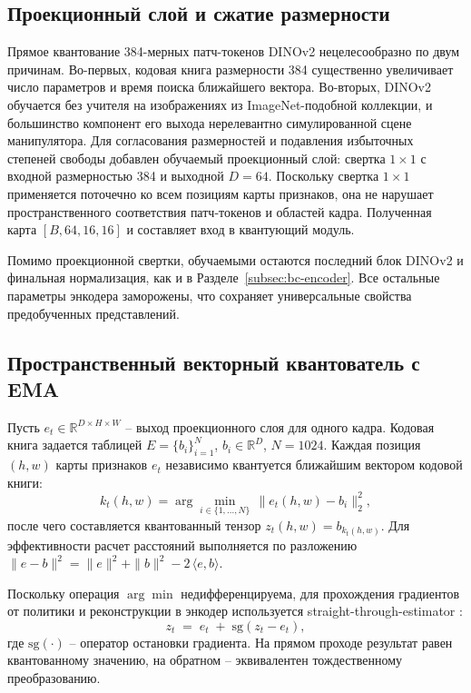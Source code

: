 \subsection{Проекционный слой и сжатие размерности}
\label{subsec:vq-proj}

Прямое квантование 384-мерных патч-токенов DINOv2 нецелесообразно по двум причинам. Во-первых, кодовая книга размерности 384 существенно увеличивает число параметров и время поиска ближайшего вектора. Во-вторых, DINOv2 обучается без учителя на изображениях из ImageNet-подобной коллекции, и большинство компонент его выхода нерелевантно симулированной сцене манипулятора. Для согласования размерностей и подавления избыточных степеней свободы добавлен обучаемый проекционный слой: свертка $1{\times}1$ с входной размерностью 384 и выходной $D = 64$. Поскольку свертка $1{\times}1$ применяется поточечно ко всем позициям карты признаков, она не нарушает пространственного соответствия патч-токенов и областей кадра. Полученная карта $[B, 64, 16, 16]$ и составляет вход в квантующий модуль.

Помимо проекционной свертки, обучаемыми остаются последний блок DINOv2 и финальная нормализация, как и в Разделе~\ref{subsec:bc-encoder}. Все остальные параметры энкодера заморожены, что сохраняет универсальные свойства предобученных представлений.

\subsection{Пространственный векторный квантователь с EMA}
\label{subsec:vq-quantizer}

Пусть $e_t \in \mathbb{R}^{D \times H \times W}$ -- выход проекционного слоя для одного кадра. Кодовая книга задается таблицей $E = \{b_i\}_{i=1}^{N}$, $b_i \in \mathbb{R}^{D}$, $N = 1024$. Каждая позиция $(h, w)$ карты признаков $e_t$ независимо квантуется ближайшим вектором кодовой книги:
\begin{equation}
    \label{eq:vq-argmin}
    k_{t}(h, w) = \arg\min_{i \in \{1, \dots, N\}} \,\bigl\| e_{t}(h, w) - b_{i} \bigr\|_{2}^{2},
\end{equation}
после чего составляется квантованный тензор $z_t(h, w) = b_{k_t(h,w)}$. Для эффективности расчет расстояний выполняется по разложению $\|e - b\|^{2} = \|e\|^{2} + \|b\|^{2} - 2\,\langle e, b\rangle$.

Поскольку операция $\arg\min$ недифференцируема, для прохождения градиентов от политики и реконструкции в энкодер используется straight-through-estimator
\cite{vandeoord2017neural}:
\begin{equation}
    \label{eq:vq-ste}
    z_t \;=\; e_t \;+\; \mathrm{sg}\!\left(z_t - e_t\right),
\end{equation}
где $\mathrm{sg}(\cdot)$ -- оператор остановки градиента. На прямом проходе результат равен квантованному значению, на обратном -- эквивалентен тождественному преобразованию.

